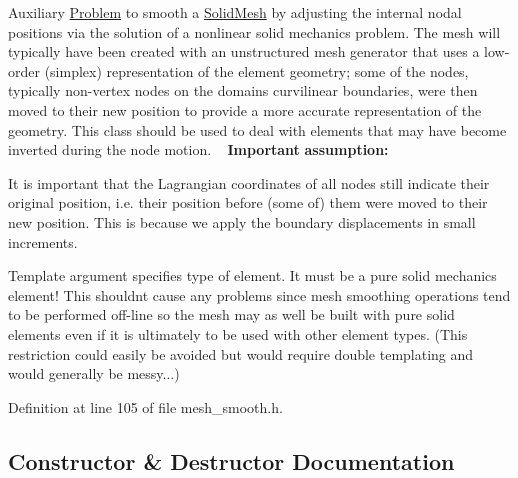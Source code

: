 Auxiliary \hyperlink{classoomph_1_1Problem}{Problem} to smooth a \hyperlink{classoomph_1_1SolidMesh}{Solid\+Mesh} by adjusting the internal nodal positions via the solution of a nonlinear solid mechanics problem. The mesh will typically have been created with an unstructured mesh generator that uses a low-\/order (simplex) representation of the element geometry; some of the nodes, typically non-\/vertex nodes on the domain\textquotesingle{}s curvilinear boundaries, were then moved to their new position to provide a more accurate representation of the geometry. This class should be used to deal with elements that may have become inverted during the node motion. ~\newline
{\bfseries Important} {\bfseries assumption\+:} 
\begin{DoxyItemize}
\item It is important that the Lagrangian coordinates of all nodes still indicate their original position, i.\+e. their position before (some of) them were moved to their new position. This is because we apply the boundary displacements in small increments.
\end{DoxyItemize}Template argument specifies type of element. It must be a pure solid mechanics element! This shouldn\textquotesingle{}t cause any problems since mesh smoothing operations tend to be performed off-\/line so the mesh may as well be built with pure solid elements even if it is ultimately to be used with other element types. (This restriction could easily be avoided but would require double templating and would generally be messy...) 

Definition at line 105 of file mesh\+\_\+smooth.\+h.



\subsection{Constructor \& Destructor Documentation}
\mbox{\label{classoomph_1_1NonLinearElasticitySmoothMesh_af452c1406ac93eea7dff91ab62f74e32}} 
